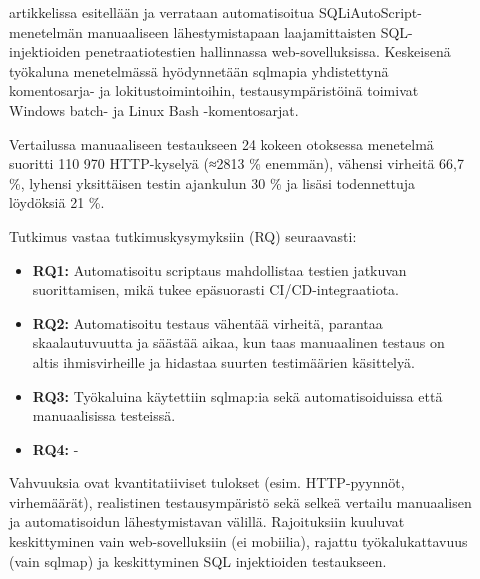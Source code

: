 \documentclass[bscthesis,finnish,oneside,biblatex]{uefcsthesis}
\begin{document}
\begin{description}
    \item[\cite{raman2019_sqli}] artikkelissa esitellään ja verrataan automatisoitua SQLiAutoScript-menetelmän manuaaliseen lähestymistapaan laajamittaisten SQL-injektioiden penetraatiotestien hallinnassa web-sovelluksissa. Keskeisenä työkaluna menetelmässä hyödynnetään sqlmapia yhdistettynä komentosarja- ja lokitustoimintoihin, testausympäristöinä toimivat Windows batch- ja Linux Bash -komentosarjat.

   Vertailussa manuaaliseen testaukseen 24 kokeen otoksessa menetelmä suoritti 110 970 HTTP-kyselyä (≈2813 \% enemmän), vähensi virheitä 66,7 \%, lyhensi yksittäisen testin ajankulun 30 \% ja lisäsi todennettuja löydöksiä 21 \%.

    Tutkimus vastaa tutkimuskysymyksiin (RQ) seuraavasti:
    \begin{itemize}
        \item \textbf{RQ1:} Automatisoitu scriptaus mahdollistaa testien jatkuvan suorittamisen, mikä tukee epäsuorasti CI/CD-integraatiota.
        \item \textbf{RQ2:} Automatisoitu testaus vähentää virheitä, parantaa skaalautuvuutta ja säästää aikaa, kun taas manuaalinen testaus on altis ihmisvirheille ja hidastaa suurten testimäärien käsittelyä.
        \item \textbf{RQ3:} Työkaluina käytettiin sqlmap:ia sekä automatisoiduissa että manuaalisissa testeissä.
        \item \textbf{RQ4:} -
    \end{itemize}

    Vahvuuksia ovat kvantitatiiviset tulokset (esim. HTTP-pyynnöt, virhemäärät), realistinen testausympäristö sekä selkeä vertailu manuaalisen ja automatisoidun lähestymistavan välillä. Rajoituksiin kuuluvat keskittyminen vain web-sovelluksiin (ei mobiilia), rajattu työkalukattavuus (vain sqlmap) ja keskittyminen SQL injektioiden testaukseen.
\end{description}
\end{document}

